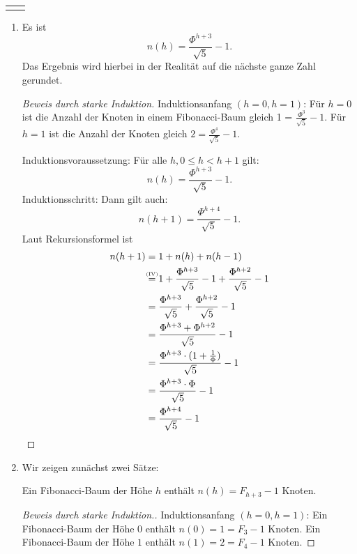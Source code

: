 \documentclass{scrartcl} %
\makeatletter
\newcommand{\headvorlage}{	
	\group{24} \hfill \textbf{\semester} \\
	\begin{tabular}{@{}l r}
		\student{Philine Stella Bock}{507316}
		\student{Devagya Sharma}{495395}
		\student{Simon Seemüller}{513084}
	\end{tabular}
	\haloesung{07}
}
\makeatother
\begin{document}
    \setcounter{auf}{0}
	\headvorlage
    \begin{aufgabe}
        \begin{enumerate}[label=(\alph*)]
            \item Es ist 
            \[
                n(h) = \frac{\Phi^{h + 3}}{\sqrt{5}} - 1.
            \]
            Das Ergebnis wird hierbei in der Realität auf die nächste ganze Zahl gerundet.
    
            \begin{proof}[Beweis durch starke Induktion]
                Induktionsanfang $(h = 0, h = 1)$: Für $h = 0$ ist die Anzahl der Knoten in einem Fibonacci-Baum gleich 1 = $\frac{\Phi^{3}}{\sqrt{5}} - 1$. Für $h = 1$ ist die Anzahl der Knoten gleich $2 = \frac{\Phi^4}{\sqrt{5}} - 1$.

                Induktionsvoraussetzung: Für alle $h, 0 \leq h < h + 1$ gilt:
                \[
                    n(h) = \frac{\Phi^{h + 3}}{\sqrt{5}} - 1.
                \]
                Induktionsschritt: Dann gilt auch:
                \[
                    n(h + 1) = \frac{\Phi^{h + 4}}{\sqrt{5}} - 1.
                \]
                Laut Rekursionsformel ist
                \begin{align*}
                    n(h + 1) &= 1 + n(h) + n(h - 1)\\
                    &\stackrel{\mathclap{\text{\tiny (IV)}}}{=} 1 + \frac{\Phi^{h + 3}}{\sqrt{5}} - 1 + \frac{\Phi^{h + 2}}{\sqrt{5}} - 1\\
                    &= \frac{\Phi^{h + 3}}{\sqrt{5}} + \frac{\Phi^{h + 2}}{\sqrt{5}} - 1\\
                    &= \frac{\Phi^{h + 3} + \Phi^{h + 2}}{\sqrt{5}} - 1\\
                    &= \frac{\Phi^{h + 3}\cdot (1 + \frac{1}{\Phi})}{\sqrt{5}} - 1\\
                    &= \frac{\Phi^{h + 3}\cdot \Phi}{\sqrt{5}} - 1\\
                    &= \frac{\Phi^{h + 4}}{\sqrt{5}} - 1
                \end{align*}
            \end{proof}
            
            \item 
            Wir zeigen zunächst zwei Sätze:
            \begin{theorem*}
                Ein Fibonacci-Baum der Höhe $h$ enthält $n(h) = F_{h + 3} - 1$ Knoten.
            \end{theorem*}
            \begin{proof}[Beweis durch starke Induktion.]
                Induktionsanfang $(h = 0, h = 1)$: Ein Fibonacci-Baum der Höhe $0$ enthält $n(0) = 1 = F_3 - 1$ Knoten. Ein Fibonacci-Baum der Höhe $1$ enthält $n(1) = 2 = F_4 - 1$ Knoten.


\end{proof}
\end{enumerate}
\end{aufgabe}
\end{document}
